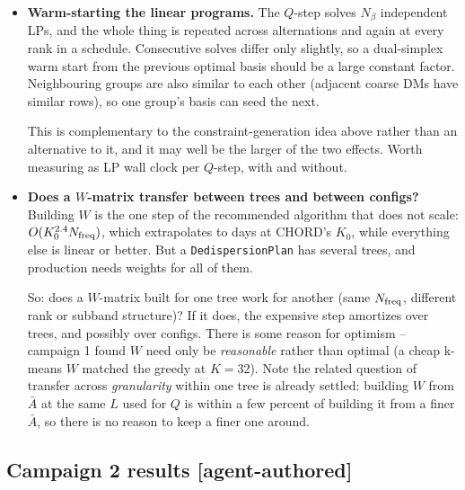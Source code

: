 \documentclass{article}
\numberwithin{equation}{section}   %
\begin{document}
\begin{itemize}
 It has several practical advantages worth testing: it is deterministic, it costs
 $O(K N_\beta N_{\rm freq})$ rather than the $O(K_0^{2.4})$ of the agglomerative greedy, the
 atoms stay nonnegative and interpretable (each is a real output's frequency response), and
 the pivot order gives a natural nested sequence of $W$-matrices -- which is exactly what a
 rank schedule wants.

\item {\bf Warm-starting the linear programs.}
 The $Q$-step solves $N_\beta$ independent LPs, and the whole thing is repeated across
 alternations and again at every rank in a schedule. Consecutive solves differ only
 slightly, so a dual-simplex warm start from the previous optimal basis should be a large
 constant factor. Neighbouring groups are also similar to each other (adjacent coarse DMs
 have similar rows), so one group's basis can seed the next.

 This is complementary to the constraint-generation idea above rather than an alternative to
 it, and it may well be the larger of the two effects. Worth measuring as LP wall clock per
 $Q$-step, with and without.

\item {\bf Does a $W$-matrix transfer between trees and between configs?}
 Building $W$ is the one step of the recommended algorithm that does not scale:
 $O(K_0^{2.4} N_{\rm freq})$, which extrapolates to days at CHORD's $K_0$, while everything
 else is linear or better. But a {\tt DedispersionPlan} has several trees, and production
 needs weights for all of them.

 So: does a $W$-matrix built for one tree work for another (same $N_{\rm freq}$, different
 rank or subband structure)? If it does, the expensive step amortizes over trees, and
 possibly over configs. There is some reason for optimism -- campaign 1 found $W$
 need only be {\em reasonable} rather than optimal (a cheap k-means $W$ matched the
 greedy at $K=32$). Note the related question of transfer across {\em granularity} within one
 tree is already settled: building $W$ from $\bar A$ at the same $L$ used for
 $Q$ is within a few percent of building it from a finer $\bar A$, so there is no
 reason to keep a finer one around.

\end{itemize}

\subsection{Campaign 2 results [agent-authored]}
\label{ssec:campaign2_results}
\end{document}
